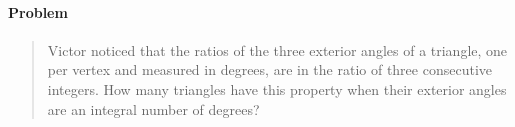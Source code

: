 \documentclass[letterpaper,12pt,twoside]{report}
\begin{document}
	\pagestyle{fancy}
	\fancyhf{}
	
	\paragraph{Problem}
	\begin{quote}
		\textsf{Victor noticed that the ratios of the
			three exterior angles of a triangle, one per
			vertex and measured in degrees, are in the
			ratio of three consecutive integers. How
			many triangles have this property when
			their exterior angles are an integral
			number of degrees?}
	\end{quote}
	
	\begin{center}
		\begin{tikzpicture}
		
		\end{tikzpicture}
	\end{center}
	
\end{document}
